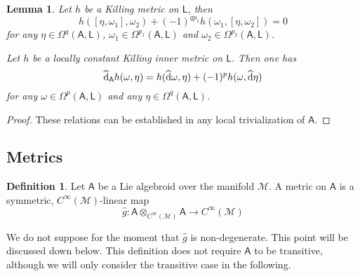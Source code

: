 \documentclass[number]{elsarticle}
\newtheorem{lemma}[theorem]{Lemma}
\theoremstyle{definition}
\newtheorem{definition}[theorem]{Definition}
\theoremstyle{remark}
\numberwithin{equation}{section}
\begin{document}
\begin{lemma}
\label{lem-killingwithform}
Let $h$ be a Killing metric on ${{{{\mathbf{\mathsf{{L}}}}}}}$, then
\begin{equation*}
h([\eta,\omega_1],\omega_2) + (-1)^{q p_1} h(\omega_1,[\eta,\omega_2]) = 0
\end{equation*}
for any $\eta\in\Omega^{q}({{{{\mathbf{\mathsf{{A}}}}}}},{{{{\mathbf{\mathsf{{L}}}}}}})$, $\omega_1\in\Omega^{p_1}({{{{\mathbf{\mathsf{{A}}}}}}},{{{{\mathbf{\mathsf{{L}}}}}}})$ and $\omega_2\in\Omega^{p_2}({{{{\mathbf{\mathsf{{A}}}}}}},{{{{\mathbf{\mathsf{{L}}}}}}})$.

Let $h$ be a locally constant Killing inner metric on ${{{{\mathbf{\mathsf{{L}}}}}}}$. Then one has 
\begin{equation*}
{\widehat{\text{\textup{d}}}}_{{{{\mathbf{\mathsf{{A}}}}}}} h(\omega,\eta) = h({\widehat{\text{\textup{d}}}}\omega,\eta) + (-1)^p h(\omega,{\widehat{\text{\textup{d}}}}\eta)
\end{equation*}
for any $\omega \in \Omega^{p}({{{{\mathbf{\mathsf{{A}}}}}}},{{{{\mathbf{\mathsf{{L}}}}}}})$ and any $\eta \in \Omega^q({{{{\mathbf{\mathsf{{A}}}}}}}, {{{{\mathbf{\mathsf{{L}}}}}}})$.
\end{lemma}

\begin{proof}
These relations can be established in any local trivialization of ${{{{\mathbf{\mathsf{{A}}}}}}}$.
\end{proof}

\subsection{Metrics}
\label{subsec-metrics}

\begin{definition}
Let ${{{{\mathbf{\mathsf{{A}}}}}}}$ be a Lie algebroid over the manifold ${{{{\mathcal{{M}}}}}}$. A metric on ${{{{\mathbf{\mathsf{{A}}}}}}}$ is a symmetric, $C^\infty({{{{\mathcal{{M}}}}}})$-linear map 
\begin{equation*}
{{\widehat{g}}} : {{{{\mathbf{\mathsf{{A}}}}}}} \otimes_{C^\infty({{{{\mathcal{{M}}}}}})} {{{{\mathbf{\mathsf{{A}}}}}}} \rightarrow C^\infty({{{{\mathcal{{M}}}}}})
\end{equation*}
\end{definition}

We do not suppose for the moment that ${{\widehat{g}}}$ is non-degenerate. This point will be discussed down below. This definition does not require ${{{{\mathbf{\mathsf{{A}}}}}}}$ to be transitive, although we will only consider the transitive case in the following.
\end{document}
